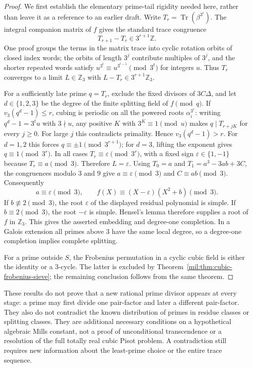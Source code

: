 \documentclass[11pt,a4paper]{article}
\theoremstyle{definition}
\theoremstyle{remark}
\numberwithin{equation}{section}
\begin{document}
\begin{proof}
We first establish the elementary prime-tail rigidity needed here, rather
than leave it as a reference to an earlier draft.
Write $T_r=\operatorname{Tr}(\beta^{3^r})$.
The integral companion matrix of $f$ gives the standard trace congruence
\[
 T_{r+1}-T_r\in3^{r+1}\mathbb Z.
\]
One proof groups the terms in the matrix trace into cyclic rotation orbits
of closed index words; the orbits of length $3^j$ contribute multiples of
$3^j$, and the shorter repeated words satisfy
$u^{3^t}\equiv u^{3^{t-1}}\pmod{3^t}$ for integers $u$.
Thus $T_r$ converges to a limit $L\in\mathbb Z_3$ with
$L-T_r\in3^{r+1}\mathbb Z_3$.

For a sufficiently late prime $q=T_r$, exclude the fixed divisors of
$3C\Delta$, and let $d\in\{1,2,3\}$ be the degree of the finite splitting
field of $f\pmod q$.
If $v_3(q^d-1)\leq r$, cubing is periodic on all the powered roots
$\alpha_i^{3^r}$: writing $q^d-1=3^t u$ with $3\nmid u$, any positive
$K$ with $3^K\equiv1\pmod u$ makes $q\mid T_{r+jK}$ for every $j\geq0$.
For large $j$ this contradicts primality.  Hence $v_3(q^d-1)>r$.
For $d=1,2$ this forces $q\equiv\pm1\pmod{3^{r+1}}$; for $d=3$,
lifting the exponent gives $q\equiv1\pmod{3^r}$.
In all cases $T_r\equiv\varepsilon\pmod{3^r}$, with a fixed sign
$\varepsilon\in\{1,-1\}$ because $T_r\equiv a\pmod3$.
Therefore $L=\varepsilon$.
Using $T_0=a$ and $T_1=a^3-3ab+3C$, the congruences modulo $3$ and $9$
give $a\equiv\varepsilon\pmod3$ and $C\equiv ab\pmod3$.  Consequently
\[
 a\equiv\varepsilon\pmod3,
 \qquad f(X)\equiv(X-\varepsilon)(X^2+b)\pmod3.
\]
If $b\not\equiv2\pmod3$, the root $\varepsilon$ of the displayed residual
polynomial is simple.  If $b\equiv2\pmod3$, the root $-\varepsilon$ is
simple.  Hensel's lemma therefore supplies a root of $f$ in $\mathbb Z_3$.
This gives the asserted embedding and degree-one completion.  In a Galois
extension all primes above $3$ have the same local degree, so a degree-one
completion implies complete splitting.

For a prime outside $S$, the Frobenius permutation in a cyclic cubic
field is either the identity or a $3$-cycle.  The latter is excluded by
Theorem~\ref{mil:thm:cubic-frobenius-sieve}; the remaining conclusion follows
from the same theorem.
\end{proof}

These results do not prove that a new rational prime divisor appears at
every stage: a prime may first divide one pair-factor and later a different
pair-factor.  They also do not contradict the known distribution of primes
in residue classes or splitting classes.  They are additional necessary
conditions on a hypothetical algebraic Mills constant, not a proof of
unconditional transcendence or a resolution of the full totally real cubic
Pisot problem.  A contradiction still requires new information about the
least-prime choice or the entire trace sequence.
\end{document}
